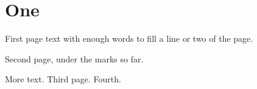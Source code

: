 \documentclass[twoside]{article}
\begin{document}
\section{One}
First page text with enough words to fill a line or two of the page.

\newpage
Second page, under the marks so far.


More text.
\newpage
Third page.
\newpage
Fourth.
\end{document}
